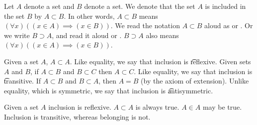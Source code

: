 
Let $A$ denote a set and $B$ denote a set.
We denote that the set $A$ is included in the set $B$ by $A \subset B$.
In other words, $A \subset B$ means $(\forall x)((x \in A) \implies (x \in B))$.
We read the notation $A \subset B$ aloud as  or .
Or we write $B \supset A$, and read it aloud  or .
$B \supset A$ also means $(\forall x)((x \in A) \implies (x \in B))$.


Given a set $A$, $A \subset A$.
Like equality, we say that inclusion is \t{reflexive}.
Given sets $A$ and $B$, if $A \subset B$ and $B \subset C$ then $A \subset C$.
Like equality, we say that inclusion is \t{transitive}.
If $A \subset B$ and $B \subset A$, then $A = B$ (by the axiom of extension).
Unlike equality, which is symmetric, we say that inclusion is \t{antisymmetric}.


Given a set $A$ inclusion is reflexive.
$A \subset A$ is always true.
$A \in A$ may be true.
Inclusion is transitive, whereas belonging is not.
